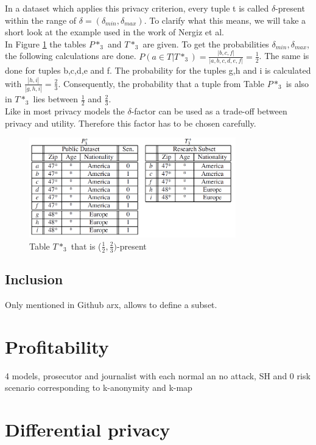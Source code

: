\documentclass[12pt, a4paper,oneside]{report}
\begin{document}
In a dataset which applies this privacy criterion, every tuple t is called $\delta$-present within the range of $\delta = (\delta_{min}, \delta_{max})$. To clarify what this means, we will take a short look at the example used in the work of Nergiz et al.\\
In Figure \ref{fig:6} the tables $P*_3$ and $T*_3$ are given. To get the probabilities $\delta_{min}, \delta_{max}$, the following calculations are done. $P(a \in T | T*_3) = \frac{|{b,c,f}|}{|{a,b,c,d,e,f}|} = \frac{1}{2}$. The same is done for tuples b,c,d,e and f. The probability for the tuples g,h and i is calculated with $\frac{|{h,i}|}{|{g,h,i}|} = \frac{2}{3}$. Consequently, the probability that a tuple from Table $P*_3$ is also in $T*_3$ lies between $\frac{1}{2}$ and $\frac{2}{3}$.\\  
Like in most privacy models the $\delta$-factor can be used as a trade-off between privacy and utility. Therefore this factor has to be chosen carefully. 
\begin{figure}[h]
	\centering
	\includegraphics[width=0.8\textwidth]{d-presence-example}
	\caption{Table $T*_3$ that is ($\frac{1}{2}, \frac{2}{3})$-present  \cite{Nergiz2007}}
	\label{fig:6}
\end{figure}


\subsection{Inclusion}

Only mentioned in Github arx, allows to define a subset. 

\section{Profitability}

4 models, prosecutor and journalist with each normal an no attack, SH and 0 risk scenario corresponding to k-anonymity and k-map

\section{Differential privacy}
\end{document}
